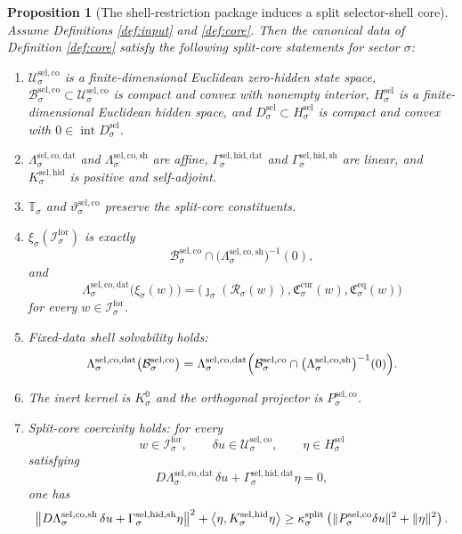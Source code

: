 \documentclass[11pt]{article}
\newcommand{\ForSpace}[1]{\mathcal I_{#1}^{\mathrm{for}}}
\newcommand{\Reduction}[1]{\mathcal R_{#1}}
\newcommand{\CurrentCarrier}[1]{\mathfrak C_{#1}^{\mathrm{cur}}}
\newcommand{\EqCarrier}[1]{\mathfrak C_{#1}^{\mathrm{eq}}}
\newcommand{\SelCoreSpace}[1]{\mathcal U_{#1}^{\mathrm{sel,co}}}
\newcommand{\SelCoreBody}[1]{\mathcal B_{#1}^{\mathrm{sel,co}}}
\newcommand{\SelCoreData}[1]{\Lambda_{#1}^{\mathrm{sel,co,dat}}}
\newcommand{\SelCoreShell}[1]{\Lambda_{#1}^{\mathrm{sel,co,sh}}}
\newcommand{\GapSpace}[1]{H_{#1}^{\mathrm{sel}}}
\newcommand{\GapBody}[1]{D_{#1}^{\mathrm{sel}}}
\newcommand{\SelHiddenData}[1]{\Gamma_{#1}^{\mathrm{sel,hid,dat}}}
\newcommand{\SelHiddenShell}[1]{\Gamma_{#1}^{\mathrm{sel,hid,sh}}}
\newcommand{\HiddenOperator}[1]{K_{#1}^{\mathrm{sel,hid}}}
\newcommand{\SelCoreSym}[1]{\mathbb T_{#1}}
\newcommand{\SelCoreTime}[1]{\vartheta_{#1}^{\mathrm{sel,co}}}
\newcommand{\SelCoreEmbed}[1]{\xi_{#1}}
\newcommand{\Kernel}[1]{K_{#1}^{0}}
\newcommand{\SelCoreProj}[1]{P_{#1}^{\mathrm{sel,co}}}
\newtheorem{proposition}{Proposition}
\begin{document}
\begin{proposition}[The shell-restriction package induces a split selector-shell core]
\label{prop:induced}
Assume Definitions \ref{def:input} and \ref{def:core}. Then the canonical data of Definition \ref{def:core} satisfy the following split-core statements for sector \(\sigma\):
\begin{enumerate}
    \item \(\SelCoreSpace{\sigma}\) is a finite-dimensional Euclidean zero-hidden state space, \(\SelCoreBody{\sigma}\subset\SelCoreSpace{\sigma}\) is compact and convex with nonempty interior, \(\GapSpace{\sigma}\) is a finite-dimensional Euclidean hidden space, and \(\GapBody{\sigma}\subset\GapSpace{\sigma}\) is compact and convex with \(0\in\operatorname{int}\GapBody{\sigma}\).
    \item \(\SelCoreData{\sigma}\) and \(\SelCoreShell{\sigma}\) are affine, \(\SelHiddenData{\sigma}\) and \(\SelHiddenShell{\sigma}\) are linear, and \(\HiddenOperator{\sigma}\) is positive and self-adjoint.
    \item \(\SelCoreSym{\sigma}\) and \(\SelCoreTime{\sigma}\) preserve the split-core constituents.
    \item \(\SelCoreEmbed{\sigma}(\ForSpace{\sigma})\) is exactly
    \[
    \SelCoreBody{\sigma}\cap
    \bigl(\SelCoreShell{\sigma}\bigr)^{-1}(0),
    \]
    and
    \begin{equation}
    \SelCoreData{\sigma}\bigl(\SelCoreEmbed{\sigma}(w)\bigr)
    =
    \bigl(
    \jmath_{\sigma}(\Reduction{\sigma}(w)),
    \CurrentCarrier{\sigma}(w),
    \EqCarrier{\sigma}(w)
    \bigr)
    \label{eq:splitcompat}
    \end{equation}
    for every \(w\in\ForSpace{\sigma}\).
    \item Fixed-data shell solvability holds:
    \begin{equation}
    \SelCoreData{\sigma}\bigl(\SelCoreBody{\sigma}\bigr)
    =
    \SelCoreData{\sigma}\Bigl(
    \SelCoreBody{\sigma}\cap
    \bigl(\SelCoreShell{\sigma}\bigr)^{-1}(0)
    \Bigr).
    \label{eq:splitsolvability}
    \end{equation}
    \item The inert kernel is \(\Kernel{\sigma}\) and the orthogonal projector is \(\SelCoreProj{\sigma}\).
    \item Split-core coercivity holds: for every
    \[
    w\in\ForSpace{\sigma},
    \qquad
    \delta u\in\SelCoreSpace{\sigma},
    \qquad
    \eta\in\GapSpace{\sigma}
    \]
    satisfying
    \[
    D\SelCoreData{\sigma}\,\delta u+\SelHiddenData{\sigma}\eta=0,
    \]
    one has
    \begin{equation}
    \bigl\|
    D\SelCoreShell{\sigma}\,\delta u+\SelHiddenShell{\sigma}\eta
    \bigr\|^{2}
    +
    \ev{\eta,\HiddenOperator{\sigma}\eta}
    \ge
    \kappa_{\sigma}^{\mathrm{split}}
    \left(
    \|\SelCoreProj{\sigma}\delta u\|^{2}
    +
    \|\eta\|^{2}
    \right).
    \label{eq:splitcoercive}
    \end{equation}
\end{enumerate}
\end{proposition}
\end{document}
